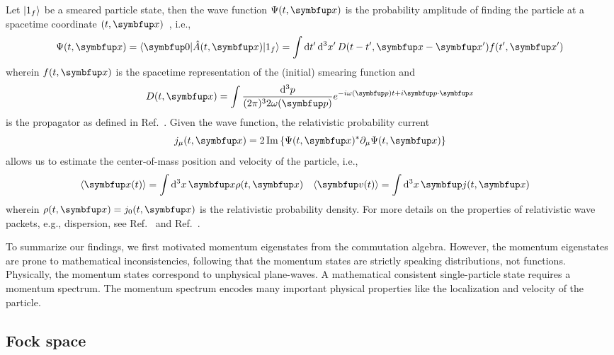 Let $\lvert1_f\rangle$ be a smeared particle state, then the wave function $\Psi(t,\vb{x})$ is the probability amplitude of finding the particle at a spacetime coordinate $(t,\vb{x})$~\cite[p.~24]{Peskin1995}, i.e.,
\begin{equation}
	\Psi(t,\vb{x})
	=
	\vacbra
	\hat{A}(t,\vb{x})
	\ket{1_f}
	=
	\int\dd{t^\prime}\dd[3]{x^\prime}
	D(t-t^\prime,\vb{x}-\vb{x}^\prime)
	f(t^\prime,\vb{x}^\prime)
\end{equation}
wherein $f(t,\vb{x})$ is the spacetime representation of the (initial) smearing function and
\begin{equation}
	D(t,\vb{x})
	=
	\int\frac{\dd[3]{p}}{(2\pi)^32\omega(\vb{p})}
	e^{-i\omega(\vb{p})t+i\vb{p}\vdot\vb{x}}
\end{equation}
is the propagator as defined in Ref.~\cite[p.~27]{Peskin1995}.
Given the wave function, the relativistic probability current
\begin{equation}
	j_\mu(t,\vb{x})
	=
	2\Im\left\{
		\Psi(t,\vb{x})^*
		\partial_\mu
		\Psi(t,\vb{x})
	\right\}
\end{equation}
allows us to estimate the center-of-mass position and velocity of the particle, i.e.,
\begin{align}
	\expval{\vb{x}(t)}
	&=
	\int\dd[3]{x}
	\vb{x}
	\rho(t,\vb{x})
	&
	\expval{\vb{v}(t)}
	&=
	\int\dd[3]{x}
	\vb{j}(t,\vb{x})
\end{align}
wherein $\rho(t,\vb{x})=j_0(t,\vb{x})$ is the relativistic probability density.
For more details on the properties of relativistic wave packets, e.g., dispersion, see Ref.~\cite{Naumov2013} and Ref.~\cite{Naumov2009}.

To summarize our findings, we first motivated momentum eigenstates from the commutation algebra.
However, the momentum eigenstates are prone to mathematical inconsistencies, following that the momentum states are strictly speaking distributions, not functions.
Physically, the momentum states correspond to unphysical plane-waves.
A mathematical consistent single-particle state requires a momentum spectrum.
The momentum spectrum encodes many important physical properties like the localization and velocity of the particle.

\subsection{Fock space}

